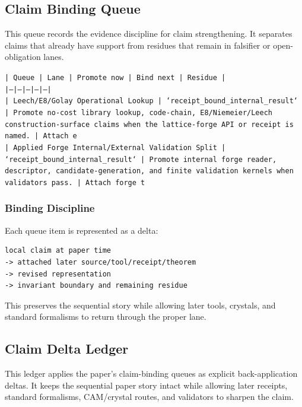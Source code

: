 \documentclass[11pt]{article}
\begin{document}
\subsection*{Claim Binding Queue}

This queue records the evidence discipline for claim strengthening. It separates claims that already have support from residues that remain in falsifier or open-obligation lanes.

\noindent\texttt{| Queue | Lane | Promote now | Bind next | Residue |}\\
\noindent\texttt{|---|---|---|---|---|}\\
\noindent\texttt{| Leech/E8/Golay Operational Lookup | `receipt\_bound\_internal\_result` | Promote no-cost library lookup, code-chain, E8/Niemeier/Leech construction-surface claims when the lattice-forge API or receipt is named. | Attach e}\\
\noindent\texttt{| Applied Forge Internal/External Validation Split | `receipt\_bound\_internal\_result` | Promote internal forge reader, descriptor, candidate-generation, and finite validation kernels when validators pass. | Attach forge t}\\

\subsubsection*{Binding Discipline}

Each queue item is represented as a delta:

\begin{verbatim}
local claim at paper time
-> attached later source/tool/receipt/theorem
-> revised representation
-> invariant boundary and remaining residue
\end{verbatim}

This preserves the sequential story while allowing later tools, crystals, and
standard formalisms to return through the proper lane.

\subsection*{Claim Delta Ledger}

This ledger applies the paper's claim-binding queues as explicit back-application
deltas. It keeps the sequential paper story intact while allowing later
receipts, standard formalisms, CAM/crystal routes, and validators to sharpen the
claim.
\end{document}
